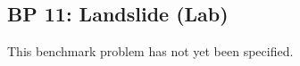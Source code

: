 \newsection

\subsection{BP 11:
 Landslide (Lab)}

This benchmark problem has not yet been specified.
